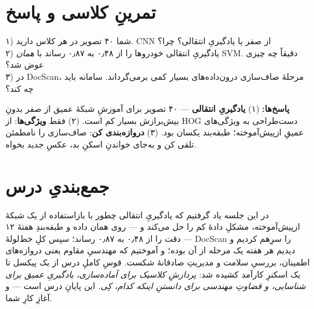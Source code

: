 \documentclass[12pt,a4paper]{article}
\begin{document}
\section{تمرینِ کلاسی و پاسخ}

\begin{tamrin}
۱) شما ۴۰ تصویر در هر کلاس دارید. CNN از صفر یا یادگیریِ انتقالی؟ چرا؟\\
۲) یادگیریِ انتقالی خودروها را از ۰٫۴۸ به ۰٫۸۷ رساند با \emph{همان} SVM. دقیقاً چه چیزی عوض شد؟\\
۳) در DocScan، مرحلهٔ صاف‌سازی درون‌داده‌های بسیار کمی برمی‌گرداند. سامانه باید چه کند؟
\end{tamrin}

\textbf{پاسخ‌ها:} (۱) \textbf{یادگیریِ انتقالی} — ۴۰ تصویر برای آموزشِ شبکهٔ عمیق از صفر بدونِ بیش‌برازش بسیار کم است. (۲) فقط \textbf{ویژگی‌ها}: از HOGِ دست‌طراحی به ویژگی‌های عمیقِ از‌پیش‌آموخته؛ طبقه‌بند یکسان بود. (۳) \textbf{دروازه‌بندی کن}: صاف‌سازی را نامطمئن تلقی کن و به‌جای خواندنِ اسکنِ بد، عکسِ جدید بخواه.

\section{جمع‌بندیِ درس}

در این جلسه یاد گرفتیم که یادگیریِ انتقالی چطور با بازاستفاده از یک شبکهٔ از‌پیش‌آموخته، مشکلِ دادهٔ کم را حل می‌کند و — روی همان داده و طبقه‌بندِ هفتهٔ ۱۲ — دقت را از ۰٫۴۸ به ۰٫۸۷ رساند؛ سپس کلِ خط‌لولهٔ DocScan را سرِ‌هم کردیم و دیدیم هر هفته یک مرحله از آن بوده؛ و آموختیم که مهندسیِ مقاوم یعنی دروازه‌های اطمینان، بررسیِ سلامت و مدیریتِ صادقانهٔ شکست. قوسِ کاملِ درس از یک پیکسل تا یک اسکنرِ کارآمد کشیده شد: \emph{پردازشِ کلاسیک برای آماده‌سازی، یادگیریِ عمیق برای شناسایی، و قضاوتِ مهندسی برای دانستنِ اینکه کدام، کِی.} این پایانِ درس است — و آغازِ کارِ شما.
\end{document}
